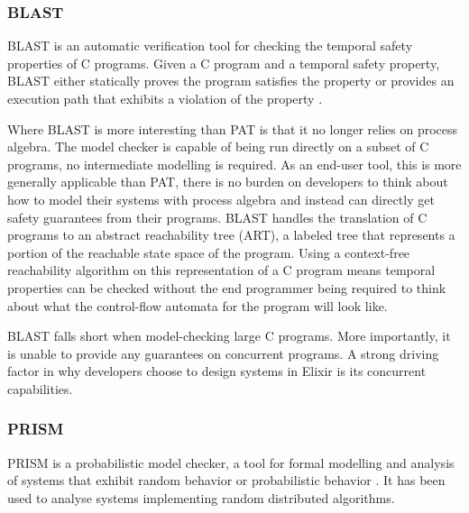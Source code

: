 \subsubsection*{\textbf{BLAST}}
BLAST is an automatic verification tool for checking the temporal safety properties of C programs. Given a C program and a temporal safety property, BLAST either statically proves the program satisfies the property or provides an execution path that exhibits a violation of the property \cite{blast}.
\par
Where BLAST is more interesting than PAT is that it no longer relies on process algebra. The model checker is capable of being run directly on a subset of C programs, no intermediate modelling is required. As an end-user tool, this is more generally applicable than PAT, there is no burden on developers to think about how to model their systems with process algebra and instead can directly get safety guarantees from their programs. BLAST handles the translation of C programs to an abstract reachability tree (ART), a labeled tree that represents a portion of the reachable state space of the program. Using a context-free reachability algorithm on this representation of a C program means temporal properties can be checked without the end programmer being required to think about what the control-flow automata for the program will look like.
\par
BLAST falls short when model-checking large C programs. More importantly, it is unable to provide any guarantees on concurrent programs. A strong driving factor in why developers choose to design systems in Elixir is its concurrent capabilities. 

\subsubsection*{\textbf{PRISM}}
PRISM is a probabilistic model checker, a tool for formal modelling and analysis of systems that exhibit random behavior or probabilistic behavior \cite{prism}. It has been used to analyse systems implementing random distributed algorithms.


